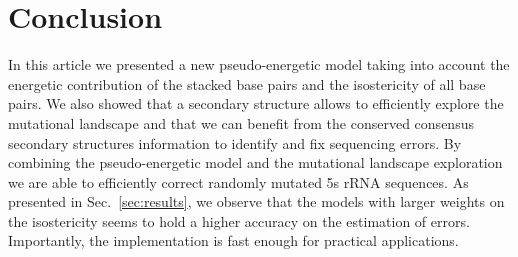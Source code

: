 \section{Conclusion}
\label{sec:conclusion}

In this article we presented a new 
 pseudo-energetic model taking into account the energetic contribution 
of the stacked base pairs and the isostericity of all base pairs. 
We also showed that a secondary structure allows to efficiently
explore the mutational landscape and that we can benefit from the
 conserved consensus secondary structures  information
to identify and fix sequencing errors.
By combining the pseudo-energetic model and the 
mutational landscape exploration we are able  to efficiently 
correct randomly mutated 5s rRNA sequences. 
As presented in Sec.~\ref{sec:results},
we observe that the models
with larger weights on the
isostericity seems to hold a higher accuracy on the estimation of errors.
Importantly, the implementation is fast enough for practical applications.
